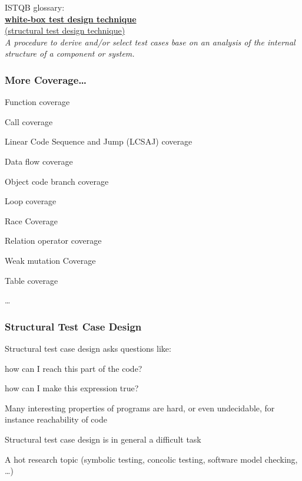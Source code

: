 \begin{itemize*}
	\item ISTQB glossary:\\
	\underline{\textbf{white-box test design technique}}\\
	\underline{(structural test design technique)}\\
	
	\textit{A procedure to derive and/or select test cases base on an analysis of the internal structure of a component or system.}
\end{itemize*}

\subsubsection{More Coverage\ldots}

\begin{itemize*}
	\item Function coverage
	\item Call coverage
	\item Linear Code Sequence and Jump (LCSAJ) coverage
	\item Data flow coverage
	\item Object code branch coverage
	\item Loop coverage
	\item Race Coverage
	\item Relation operator coverage
	\item Weak mutation Coverage
	\item Table coverage
	\item \ldots
\end{itemize*}

\subsubsection{Structural Test Case Design}

\begin{itemize*}
	\item Structural test case design asks questions like:
	\begin{itemize*}
		\item how can I reach this part of the code?
		\item how can I make this expression true?
	\end{itemize*}
	\item Many interesting properties of programs are hard, or even
	undecidable, for instance reachability of code
	\item Structural test case design is in general a difficult task
	\item A hot research topic (symbolic testing, concolic testing, software model checking, \ldots)
\end{itemize*}
